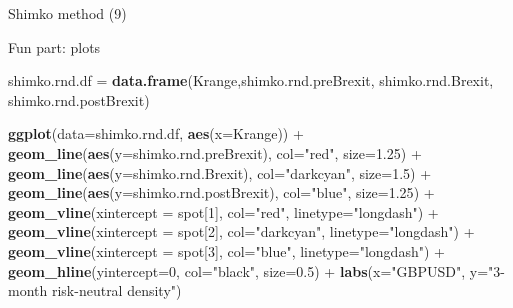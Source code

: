 \documentclass[ignorenonframetext,aspectratio=169]{beamer}
\newenvironment{Shaded}{}{}
\newcommand{\KeywordTok}[1]{\textcolor[rgb]{0.00,0.44,0.13}{\textbf{#1}}}
\newcommand{\DataTypeTok}[1]{\textcolor[rgb]{0.56,0.13,0.00}{#1}}
\newcommand{\DecValTok}[1]{\textcolor[rgb]{0.25,0.63,0.44}{#1}}
\newcommand{\FloatTok}[1]{\textcolor[rgb]{0.25,0.63,0.44}{#1}}
\newcommand{\StringTok}[1]{\textcolor[rgb]{0.25,0.44,0.63}{#1}}
\newcommand{\OperatorTok}[1]{\textcolor[rgb]{0.40,0.40,0.40}{#1}}
\newcommand{\NormalTok}[1]{#1}
\begin{document}
\begin{frame}[fragile]{Shimko method (9)}

Fun part: plots

\begin{Shaded}
\begin{Highlighting}[]
\NormalTok{shimko.rnd.df =}\StringTok{ }\KeywordTok{data.frame}\NormalTok{(Krange,shimko.rnd.preBrexit, }
\NormalTok{                           shimko.rnd.Brexit, shimko.rnd.postBrexit)}

\KeywordTok{ggplot}\NormalTok{(}\DataTypeTok{data=}\NormalTok{shimko.rnd.df, }\KeywordTok{aes}\NormalTok{(}\DataTypeTok{x=}\NormalTok{Krange)) }\OperatorTok{+}\StringTok{ }
\StringTok{  }\KeywordTok{geom_line}\NormalTok{(}\KeywordTok{aes}\NormalTok{(}\DataTypeTok{y=}\NormalTok{shimko.rnd.preBrexit), }\DataTypeTok{col=}\StringTok{"red"}\NormalTok{, }\DataTypeTok{size=}\FloatTok{1.25}\NormalTok{) }\OperatorTok{+}
\StringTok{  }\KeywordTok{geom_line}\NormalTok{(}\KeywordTok{aes}\NormalTok{(}\DataTypeTok{y=}\NormalTok{shimko.rnd.Brexit), }\DataTypeTok{col=}\StringTok{"darkcyan"}\NormalTok{, }\DataTypeTok{size=}\FloatTok{1.5}\NormalTok{) }\OperatorTok{+}
\StringTok{  }\KeywordTok{geom_line}\NormalTok{(}\KeywordTok{aes}\NormalTok{(}\DataTypeTok{y=}\NormalTok{shimko.rnd.postBrexit), }\DataTypeTok{col=}\StringTok{"blue"}\NormalTok{, }\DataTypeTok{size=}\FloatTok{1.25}\NormalTok{) }\OperatorTok{+}
\StringTok{  }\KeywordTok{geom_vline}\NormalTok{(}\DataTypeTok{xintercept =}\NormalTok{ spot[}\DecValTok{1}\NormalTok{], }\DataTypeTok{col=}\StringTok{"red"}\NormalTok{, }\DataTypeTok{linetype=}\StringTok{"longdash"}\NormalTok{) }\OperatorTok{+}\StringTok{ }
\StringTok{  }\KeywordTok{geom_vline}\NormalTok{(}\DataTypeTok{xintercept =}\NormalTok{ spot[}\DecValTok{2}\NormalTok{], }\DataTypeTok{col=}\StringTok{"darkcyan"}\NormalTok{, }\DataTypeTok{linetype=}\StringTok{"longdash"}\NormalTok{) }\OperatorTok{+}
\StringTok{  }\KeywordTok{geom_vline}\NormalTok{(}\DataTypeTok{xintercept =}\NormalTok{ spot[}\DecValTok{3}\NormalTok{], }\DataTypeTok{col=}\StringTok{"blue"}\NormalTok{, }\DataTypeTok{linetype=}\StringTok{"longdash"}\NormalTok{) }\OperatorTok{+}
\StringTok{  }\KeywordTok{geom_hline}\NormalTok{(}\DataTypeTok{yintercept=}\DecValTok{0}\NormalTok{, }\DataTypeTok{col=}\StringTok{"black"}\NormalTok{, }\DataTypeTok{size=}\FloatTok{0.5}\NormalTok{) }\OperatorTok{+}
\StringTok{  }\KeywordTok{labs}\NormalTok{(}\DataTypeTok{x=}\StringTok{"GBPUSD"}\NormalTok{, }\DataTypeTok{y=}\StringTok{"3-month risk-neutral density"}\NormalTok{)   }
\end{Highlighting}
\end{Shaded}

\end{frame}
\end{document}
